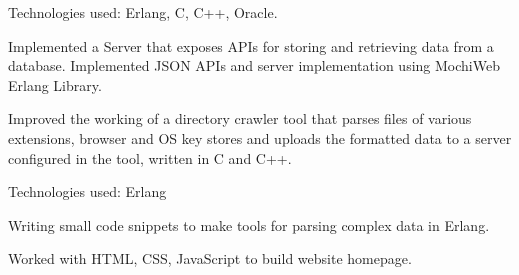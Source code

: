 \documentclass[]{deedy-resume-openfont}
\begin{document}
\begin{minipage}[t]{0.66\textwidth}
\begin{tightemize}\item Technologies used: Erlang, C, C++, Oracle.
\item Implemented a Server that exposes APIs for storing and retrieving data from a database. Implemented JSON APIs and server implementation using MochiWeb Erlang Library.
\item Improved the working of a directory crawler tool that parses files of various extensions, browser and OS key stores and uploads the formatted data to a server configured in the tool, written in C and C++.
\end{tightemize}
\sectionsep

\begin{tightemize}
\item Technologies used: Erlang
\item  Writing small code snippets to make tools for parsing complex data in Erlang.\end{tightemize}
\sectionsep

\begin{tightemize}
\item Worked with HTML, CSS, JavaScript to build website homepage.\end{tightemize}
\sectionsep
\end{minipage} 
\end{document}
